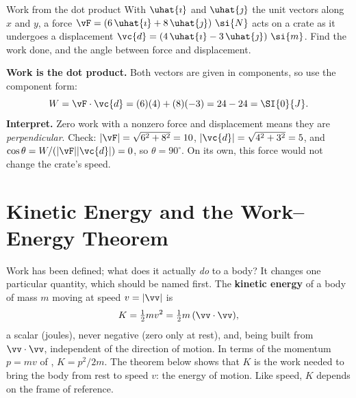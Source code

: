 \begin{exbox}{Work from the dot product}
With $\uhat{\imath}$ and $\uhat{\jmath}$ the unit vectors along $x$ and $y$,
a force $\vF=(6\,\uhat{\imath}+8\,\uhat{\jmath})\ \si{N}$ acts on a crate as it undergoes a displacement
$\vc{d}=(4\,\uhat{\imath}-3\,\uhat{\jmath})\ \si{m}$. Find the work done, and the angle between force and
displacement.

 \textbf{Work is the dot product.} Both vectors are given in components, so use the component form:
\[
W=\vF\cdot\vc{d}=(6)(4)+(8)(-3)=24-24=\SI{0}{J}.
\]
 \textbf{Interpret.} Zero work with a nonzero force and displacement means they are
\emph{perpendicular}. Check: $|\vF|=\sqrt{6^2+8^2}=10$, $|\vc{d}|=\sqrt{4^2+3^2}=5$, and
$\cos\theta=W/(|\vF||\vc{d}|)=0$, so $\theta=90^\circ$. On its own, this force would not change the
crate's speed.
\end{exbox}

\section{Kinetic Energy and the Work--Energy Theorem}

Work has been defined; what does it actually \emph{do} to a body? It changes one particular quantity,
which should be named first. The \textbf{kinetic energy} of a body of mass $m$
moving at speed $v=|\vv|$ is
\[
K=\tfrac12 m v^2=\tfrac12 m\,(\vv\cdot\vv),
\]
a scalar (joules), never negative (zero only at rest), and, being built from $\vv\cdot\vv$, independent of the
direction of motion. In terms of the momentum $p=mv$ of , $K=p^2/2m$. The theorem below
shows that $K$ is the work needed to bring the body from rest to speed $v$: the energy of motion. Like
speed, $K$ depends on the frame of reference.

